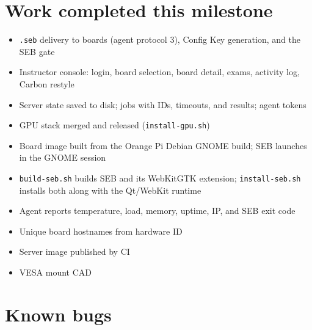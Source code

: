 \documentclass[11pt]{article}
\begin{document}
\section{Work completed this milestone}

\begin{itemize}
  \item \texttt{.seb} delivery to boards (agent protocol 3), Config Key generation, and the SEB gate
  \item Instructor console: login, board selection, board detail, exams, activity log, Carbon restyle
  \item Server state saved to disk; jobs with IDs, timeouts, and results; agent tokens
  \item GPU stack merged and released (\texttt{install-gpu.sh})
  \item Board image built from the Orange Pi Debian GNOME build; SEB launches in the GNOME session
  \item \texttt{build-seb.sh} builds SEB and its WebKitGTK extension; \texttt{install-seb.sh} installs both along with the Qt/WebKit runtime
  \item Agent reports temperature, load, memory, uptime, IP, and SEB exit code
  \item Unique board hostnames from hardware ID
  \item Server image published by CI
  \item VESA mount CAD
\end{itemize}

\section{Known bugs}
\end{document}
